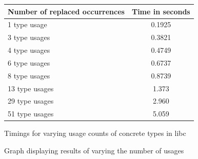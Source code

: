 
\begin{figure}[h]
\begin{center}
    \begin{tabular}{ | l | c |}
    \hline
    \textbf{Number of replaced occurrences} & \textbf{Time in seconds} \\ \hline
    1 type usage &  0.1925  \\ \hline
    3 type usages &  0.3821  \\ \hline
    4 type usages &   0.4749  \\ \hline
    6 type usages &   0.6737  \\ \hline
    8 type usages &   0.8739 \\ \hline
    13 type usages  &  1.373 \\ \hline
    29 type usages &  2.960  \\ \hline
    51 type usages &  5.059 \\ \hline
    \end{tabular}
\end{center}

\caption{Timings for varying usage counts of concrete types in libc}
\label{Fig:scaling}
\end{figure}

\begin{figure}[h]
\begin{center}
\caption{Graph displaying results of varying the number of usages}
\label{Fig:comparerefs}
\end{center}
\end{figure}

